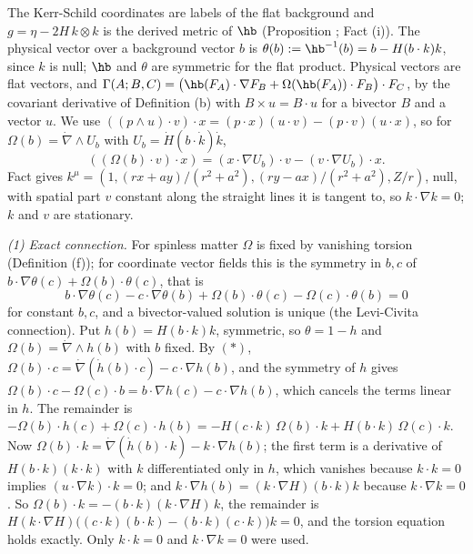 The Kerr-Schild coordinates are labels of the flat background and $g = \eta - 2H\,k \otimes k$ is the derived metric of $\hb$ (Proposition ; Fact (i)). The physical vector over a background vector $b$ is $\theta(b) := \hb^{-1}(b) = b - H(b \cdot k)k$, since $k$ is null; $\hb$ and $\theta$ are symmetric for the flat product. Physical vectors are flat vectors, and $\Gamma(A; B, C) = \bigl(\hb(F_A) \cdot \nabla F_B + \Omega(\hb(F_A)) \cdot F_B\bigr) \cdot F_C$, by the covariant derivative of Definition (b) with $B \times u = B \cdot u$ for a bivector $B$ and a vector $u$. We use $((p \wedge u) \cdot v) \cdot x = (p \cdot x)(u \cdot v) - (p \cdot v)(u \cdot x)$, so for $\Omega(b) = \dot\nabla \wedge U_b$ with $U_b = \dot H(b \cdot \dot k)\dot k$,
\[
((\Omega(b) \cdot v) \cdot x) = (x \cdot \nabla U_b) \cdot v - (v \cdot \nabla U_b) \cdot x . \tag{$*$}
\]
Fact  gives $k^\mu = (1, (rx + ay)/(r^2 + a^2), (ry - ax)/(r^2 + a^2), Z/r)$, null, with spatial part $v$ constant along the straight lines it is tangent to, so $k \cdot \nabla k = 0$; $k$ and $v$ are stationary.

\emph{(1) Exact connection.} For spinless matter $\Omega$ is fixed by vanishing torsion (Definition (f)); for coordinate vector fields this is the symmetry in $b, c$ of $b \cdot \nabla\theta(c) + \Omega(b) \cdot \theta(c)$, that is
\[
b \cdot \nabla\theta(c) - c \cdot \nabla\theta(b) + \Omega(b) \cdot \theta(c) - \Omega(c) \cdot \theta(b) = 0
\]
for constant $b, c$, and a bivector-valued solution is unique (the Levi-Civita connection). Put $h(b) = H(b \cdot k)k$, symmetric, so $\theta = 1 - h$ and $\Omega(b) = \dot\nabla \wedge h(b)$ with $b$ fixed. By $(*)$, $\Omega(b) \cdot c = \dot\nabla(\dot h(b) \cdot c) - c \cdot \nabla h(b)$, and the symmetry of $h$ gives $\Omega(b) \cdot c - \Omega(c) \cdot b = b \cdot \nabla h(c) - c \cdot \nabla h(b)$, which cancels the terms linear in $h$. The remainder is $-\Omega(b) \cdot h(c) + \Omega(c) \cdot h(b) = -H(c \cdot k)\,\Omega(b) \cdot k + H(b \cdot k)\,\Omega(c) \cdot k$. Now $\Omega(b) \cdot k = \dot\nabla(\dot h(b) \cdot k) - k \cdot \nabla h(b)$; the first term is a derivative of $H(b \cdot k)(k \cdot k)$ with $k$ differentiated only in $h$, which vanishes because $k \cdot k = 0$ implies $(u \cdot \nabla k) \cdot k = 0$; and $k \cdot \nabla h(b) = (k \cdot \nabla H)(b \cdot k)k$ because $k \cdot \nabla k = 0$. So $\Omega(b) \cdot k = -(b \cdot k)(k \cdot \nabla H)\,k$, the remainder is $H(k \cdot \nabla H)\bigl((c \cdot k)(b \cdot k) - (b \cdot k)(c \cdot k)\bigr)k = 0$, and the torsion equation holds exactly. Only $k \cdot k = 0$ and $k \cdot \nabla k = 0$ were used.

